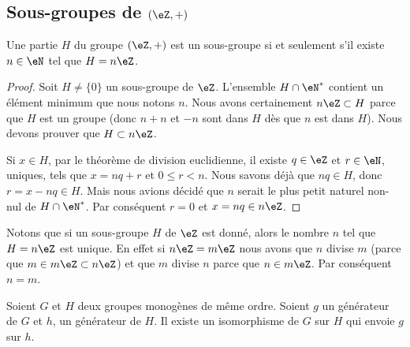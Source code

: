 
\subsection{Sous-groupes de \( (\eZ,+)\) }

\begin{proposition} \label{PropSsgpZestnZ}
    Une partie \( H\) du groupe \( (\eZ,+)\) est un sous-groupe si et seulement s'il existe \( n\in\eN\) tel que \( H=n\eZ\).
\end{proposition}

\begin{proof}
    Soit \( H\neq\{ 0 \}\) un sous-groupe de \( \eZ\). L'ensemble \( H\cap\eN^*\) contient un élément minimum que nous notons \( n\). Nous avons certainement \( n\eZ\subset H\) parce que \( H\) est un groupe (donc \( n+n\) et \( -n\) sont dans \( H\) dès que \( n\) est dans \( H\)). Nous devons prouver que \( H\subset n\eZ\).

    Si \( x\in H\), par le théorème de division euclidienne, il existe \( q\in\eZ\) et \( r\in\eN \), uniques, tels que \( x=nq+r\) et \(0 \leq r < n \). Nous savons déjà que \( nq\in H\), donc \( r = x - nq \in H \). Mais nous avions décidé que \( n\) serait le plus petit naturel non-nul de \( H\cap\eN^*\). Par conséquent \( r=0\) et \( x=nq\in n\eZ\).
\end{proof}


Notons que si un sous-groupe \( H\) de \( \eZ\) est donné, alors le nombre \( n\) tel que \( H=n\eZ\) est unique. En effet si \( n\eZ=m\eZ\) nous avons que \( n\) divise \( m\) (parce que \( m\in m\eZ\subset n\eZ\)) et que \( m\) divise \( n\) parce que \( n\in m\eZ\). Par conséquent \( n=m\).

\begin{lemma}   \label{LemZhxMit}
    Soient \( G\) et \( H\) deux groupes monogènes de même ordre. Soient \( g\) un générateur de \( G\) et \( h\), un générateur de \( H\). Il existe un isomorphisme de \( G\) sur \( H\) qui envoie \( g\) sur \( h\).
\end{lemma}

